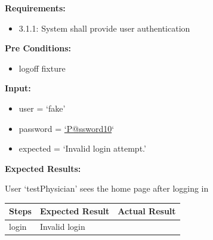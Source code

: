 \documentclass[letterpaper,10pt,english]{sphinxmanual}
\begin{document}
\begin{fulllineitems}
\label{STD/test_login:test_login.test_login_bad_user}
\textbf{Requirements:}
\begin{itemize}
\item {} 
3.1.1: System shall provide user authentication

\end{itemize}

\textbf{Pre Conditions:}
\begin{itemize}
\item {} 
logoff fixture

\end{itemize}

\textbf{Input:}
\begin{itemize}
\item {} 
user = `fake'

\item {} 
password = \href{mailto:'P@ssword10}{`P@ssword10}`

\item {} 
expected = `Invalid login attempt.'

\end{itemize}

\textbf{Expected Results:}

User `testPhysician' sees the home page after logging in

\begin{tabulary}{\linewidth}{|L|L|L|}
\hline
\textsf{\relax 
Steps
} & \textsf{\relax 
Expected Result
} & \textsf{\relax 
Actual Result
}\\
\hline
login
 & 
Invalid login
 & \\
\hline\end{tabulary}


\end{fulllineitems}

\end{document}
